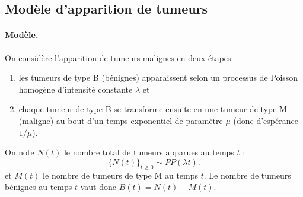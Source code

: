 \subsection{Modèle d'apparition de tumeurs}


\paragraph{Modèle.}
On considère l'apparition de tumeurs malignes en deux étapes:
\begin{enumerate}
  \item les tumeurs de type B (bénignes) apparaissent selon un processus de Poisson homogène d'intensité constante $\lambda$ et
  \item chaque tumeur de type B se transforme ensuite en une tumeur de type M (maligne) au bout d'un temps exponentiel de paramètre $\mu$ (donc d'espérance $1/\mu$).
\end{enumerate}

On note $N(t)$ le nombre total de tumeurs apparues au temps $t$ : 
$$
\{N(t)\}_{t \geq 0} \sim PP(\lambda t).
$$
et $M(t)$ le nombre de tumeurs de type M au temps $t$. Le nombre de tumeurs bénignes au temps $t$ vaut donc $B(t) = N(t) - M(t)$.

\bigskip
